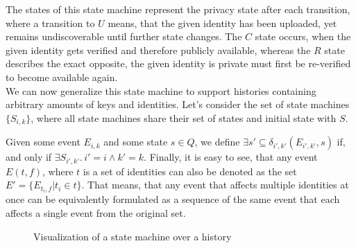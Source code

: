 The states of this state machine represent the privacy state after each transition, where a transition to \(U\) means, that the given identity has been uploaded, yet remains undiscoverable until further state changes. The \(C\) state occurs, when the given identity gets verified and therefore publicly available, whereas the \(R\) state describes the exact opposite, the given identity is private must first be re-verified to become available again.
\\

We can now generalize this state machine to support histories containing arbitrary amounts of keys and identities. Let's consider the set of state machines \(\{S_{i,k}\}\), where all state machines share their set of states and initial state with \(S\). 

Given some event \(E_{i,k}\) and some state \(s \in Q\), we define \( \exists {s'} \subseteq \delta_{i',k'}(E_{i',k'},s) \) if, and only if \( \exists S_{i',k'} .\, i' = i \wedge k' = k\).
Finally, it is easy to see, that any event \(E(t,f)\), where \(t\) is a set of identities can also be denoted as the set \(E' = \{E_{t_i,f} | t_i \in t\} \). That means, that any event that affects multiple identities at once can be equivalently formulated as a sequence of the same event that each affects a single event from the original set.

\begin{figure}[h]
    \centering
    \caption{Visualization of a state machine over a history}
\end{figure}

